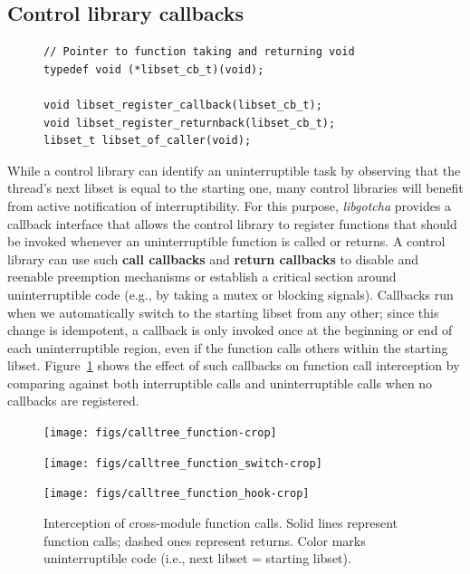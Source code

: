\subsection{Control library callbacks}
\label{sec:libgotcha:callbacks}

\begin{figure}
\begin{lstlisting}[label=lst:gotchacbapi,caption=\textit{libgotcha} C callback interface]
// Pointer to function taking and returning void
typedef void (*libset_cb_t)(void);

void libset_register_callback(libset_cb_t);
void libset_register_returnback(libset_cb_t);
libset_t libset_of_caller(void);
\end{lstlisting}
\end{figure}

While a control library can identify an uninterruptible task by observing that the
thread's next libset is equal to the starting one, many control libraries will
benefit from active notification of interruptibility.  For this purpose,
\textit{libgotcha} provides
a callback interface that allows the control library to register functions that
should be invoked whenever an uninterruptible function is called or returns.  A
control library can use such \textbf{call callbacks} and \textbf{return callbacks}
to disable and reenable preemption mechanisms or establish a critical
section around uninterruptible code (e.g., by taking a mutex or blocking signals).
Callbacks run when we automatically switch to the starting libset from any other;
since this change is idempotent, a callback is only invoked once at the beginning or
end of each uninterruptible region, even if the function calls others within the
starting libset.  Figure~\ref{fig:gotchahooks} shows the effect of such callbacks on
function call interception by comparing against both interruptible calls and
uninterruptible calls when no callbacks are registered.

\begin{figure}
	\begin{minipage}{\textwidth}
	\texttt{[image: figs/calltree\_function-crop]}
	\end{minipage}

	\begin{minipage}{\textwidth}
	\texttt{[image: figs/calltree\_function\_switch-crop]}
	\end{minipage}

	\begin{minipage}{\textwidth}
	\texttt{[image: figs/calltree\_function\_hook-crop]}
	\end{minipage}
\caption[Interception of cross-module function calls]{
Interception of cross-module function calls. Solid lines represent function calls;
dashed ones represent returns. Color marks uninterruptible code (i.e., next libset =
starting libset).}
\label{fig:gotchahooks}
\end{figure}

